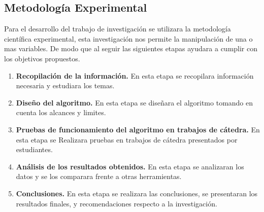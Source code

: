 \subsection{Metodología Experimental}
Para el desarrollo del trabajo de investigación se utilizara la metodología científica experimental, esta investigación 
nos permite la manipulación de una o mas variables. De modo que al seguir las siguientes etapas ayudara a cumplir con los objetivos propuestos.
\begin{enumerate}
  \item \textbf{Recopilación de la información.} En esta etapa se recopilara información necesaria y estudiara los temas.
  \item \textbf{Diseño del algoritmo.} En esta etapa se diseñara el algoritmo tomando en cuenta los alcances y limites.
  \item \textbf{Pruebas de funcionamiento del algoritmo en trabajos de cátedra.} En esta etapa se Realizara pruebas en trabajos de cátedra presentados por estudiantes.
  \item \textbf{Análisis de los resultados obtenidos.} En esta etapa se analizaran los datos y se los comparara frente a otras herramientas.
  \item \textbf{Conclusiones.} En esta etapa se realizara las conclusiones, se presentaran los resultados finales, y recomendaciones respecto a la investigación.
\end{enumerate}